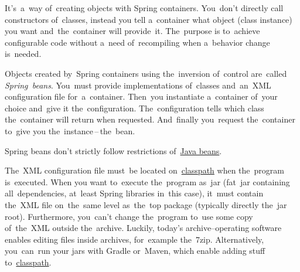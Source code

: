 \label{inversionofcontrol}
It's~a~way of~creating objects with Spring containers. You~don't directly call constructors of~classes, instead you tell a~container what object (class instance) you want and~the~container will provide~it. The~purpose is to~achieve configurable code without a~need of~recompiling when a~behavior change is~needed.

Objects created by~Spring containers using the~inversion of~control are~called \textit{Spring~beans}. You~must provide implementations of~classes and~an~XML configuration file for~a~container. Then~you instantiate a~container of~your choice and~give it the~configuration. The~configuration tells which class the~container will return when requested. And~finally you~request the~container to~give you the~instance\,--\,the~bean.

\warning Spring beans don't strictly follow restrictions of~\hyperref[javabeans]{Java beans}.

\warning The~XML configuration file must~be located on~\hyperref[classpath]{classpath} when the~program is~executed. When you want to~execute the~program as~jar (fat~jar containing all~dependencies, at~least Spring libraries in~this case), it~must contain the~XML file on~the~same level as~the~top package (typically directly the~jar root). Furthermore, you~can't change the~program to~use some copy of~the~XML outside the~archive. Luckily, today's archive--operating software enables editing files inside archives, for~example the~7zip. Alternatively, you~can~run your jars with Gradle or~Maven, which enable adding stuff to~\hyperref[classpath]{classpath}.
\newpage

